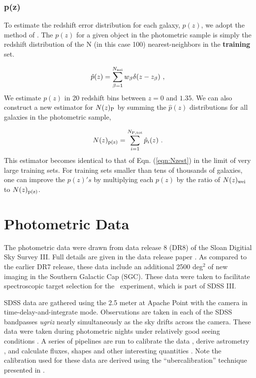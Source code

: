 \documentclass{emulateapj}
\newcommand{\nwei}{N(z)_{\rm wei}}
\newcommand{\npz}{N(z)_{\rm p(z)}}
\begin{document}
\subsubsection{p(z)}

To estimate the redshift error distribution for each galaxy, $p(z)$,
we adopt the method of \cite{CunhaPhotoz09}. The $p(z)$ for a given object in the
photometric sample is simply the redshift distribution of the N (in this case
100) nearest-neighbors in the {\bf training} set.

\begin{equation}
\hat{p}(z) = \sum_{\beta=1}^{N_{\rm nei}} w_\beta \delta(z-z_\beta)~,
\label{eqn:pzest}
\end{equation}
\noindent 
We estimate $p(z)$ in 20 redshift bins between $z=0$ and $1.35$. 
We can also construct a new estimator for $N(z)_{\rm P}$ by summing the 
$\hat{p}(z)$ distributions for all galaxies in the photometric sample,


\begin{equation}
\npz = \sum_{i=1}^{N_{\rm P,tot}}\hat{p}_i(z)~.
\label{eqn:Nhat2}
\end{equation}
\noindent This estimator becomes identical to that of Eqn. (\ref{eqn:Nzest})
in the limit of very large training sets.  For training sets smaller than tens
of thousands of galaxies, one can improve the $p(z)'s$ by multiplying each $p(z)$ by the
ratio of $\nwei$ to $\npz$.
 


\section{Photometric Data}

The photometric data were drawn from data release 8 (DR8) of the Sloan Digitial
Sky Survey III.  Full details are given in the data release paper \citet{dr8}.
As compared to the earlier DR7 release, these data include an additional 2500
deg$^2$ of new imaging in the Southern Galactic Cap (SGC). These data were
taken to facilitate spectroscopic target selection for the \boss\ experiment,
which is part of SDSS III.


SDSS data are gathered using the 2.5 meter at Apache Point \citep{Gunn06} with
the camera \citep{Gunn98} in time-delay-and-integrate mode.  Observations are
taken in each of the SDSS bandpasses {\it ugriz} nearly simultaneously as the
sky drifts across the camera.  These data were taken during photometric nights
under relatively good seeing conditions \citep{Hogg01}.  A series of pipelines
are run to calibrate the data \citep{Nikhil08,Smith02,Tucker06}, derive
astrometry \citep{Pier03}, and calculate fluxes, shapes and other interesting
quantities \citep{LuptonADASS01}.  Note the calibration used for these data are
derived using the ``ubercalibration'' technique presented in \citet{Nikhil08}.
\end{document}
